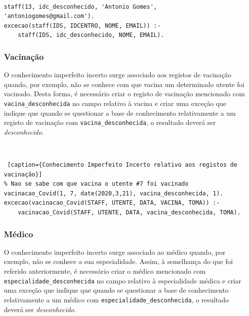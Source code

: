 \documentclass[a4paper, 11pt]{article}
\begin{document}
\

\begin{lstlisting}[caption={Conhecimento Imperfeito Incerto relativo ao \textit{staff} do centro de 
saúde}]
% Nao se sabe em que centro de saude o Antonio exerce funcoes
staff(13, idc_desconhecido, 'Antonio Gomes', 'antoniogomes@gmail.com').
excecao(staff(IDS, IDCENTRO, NOME, EMAIL)) :- 
    staff(IDS, idc_desconhecido, NOME, EMAIL).
\end{lstlisting}

\subsubsection*{Vacinação}

O conhecimento imperfeito incerto surge associado aos registos de vacinação quando, por exemplo, 
não se conhece com que vacina
um determinado utente foi vacinado. Desta forma, é necessário criar o registo de vacinação 
mencionado com
\texttt{vacina\_desconhecida} no campo relativo à vacina e criar uma exceção que indique que 
quando
se questionar a base de conhecimento relativamente a um registo de vacinação com 
\texttt{vacina\_desconhecida}, o resultado deverá ser \textit{desconhecido}.

\

\begin{lstlisting} [caption={Conhecimento Imperfeito Incerto relativo aos registos de vacinação}]
% Nao se sabe com que vacina o utente #7 foi vacinado
vacinacao_Covid(1, 7, date(2020,3,21), vacina_desconhecida, 1).
excecao(vacinacao_Covid(STAFF, UTENTE, DATA, VACINA, TOMA)) :-
    vacinacao_Covid(STAFF, UTENTE, DATA, vacina_desconhecida, TOMA).
\end{lstlisting}


\subsubsection*{Médico}

O conhecimento imperfeito incerto surge associado ao médico quando, por exemplo, não se conhece a 
sua especialidade. Assim, à semelhança do que foi referido anteriormente, é necessário criar o 
médico mencionado com
\texttt{especialidade\_desconhecida} no campo relativo à especialidade médica e criar uma 
exceção que indique que quando se questionar a base de conhecimento relativamente a um médico 
com \texttt{especialidade\_desconhecida}, o resultado deverá ser \textit{desconhecido}.


\
\end{document}

